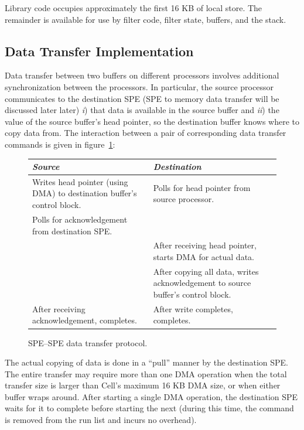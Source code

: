 Library code occupies approximately the first 16 KB of local store. The remainder is available for use by filter code, filter state, buffers, and the stack.

\subsection{Data Transfer Implementation}

Data transfer between two buffers on different processors involves additional synchronization between the processors. In particular, the source processor communicates to the destination SPE (SPE to memory data transfer will be discussed later later) \emph{i}) that data is available in the source buffer and \emph{ii}) the value of the source buffer's head pointer, so the destination buffer knows where to copy data from. The interaction between a pair of corresponding data transfer commands is given in figure~\ref{fig:lib:dt}:

\begin{figure}[!htb]
\begin{center}
\begin{tabular}{p{2.5in}p{2.5in}}
\emph{Source} & \emph{Destination} \\
\hline
Writes head pointer (using DMA) to destination buffer's control block. & Polls for head pointer from source processor. \\
Polls for acknowledgement from destination SPE. & \\
& After receiving head pointer, starts DMA for actual data. \\
& After copying all data, writes acknowledgement to source buffer's control block. \\
After receiving acknowledgement, completes. & After write completes, completes.
\end{tabular}
\end{center}
\caption{SPE--SPE data transfer protocol.}
\label{fig:lib:dt}
\end{figure}

The actual copying of data is done in a ``pull'' manner by the destination SPE. The entire transfer may require more than one DMA operation when the total transfer size is larger than Cell's maximum 16 KB DMA size, or when either buffer wraps around. After starting a single DMA operation, the destination SPE waits for it to complete before starting the next (during this time, the command is removed from the run list and incurs no overhead).

